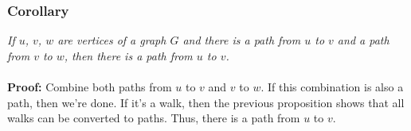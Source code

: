 \documentclass{report}
\begin{document}
\subsubsection{Corollary}
\textit{If $u$, $v$, $w$ are vertices of a graph $G$ and there is a path from $u$ to $v$ and a path from $v$ to $w$, then there is a path from $u$ to $v$.}\\\\
\textbf{Proof:} Combine both paths from $u$ to $v$ and $v$ to $w$. If this combination is also a path, then we're done. If it's a walk, then the previous proposition shows that all walks can be converted to paths. Thus, there is a path from $u$ to $v$.
\end{document}
